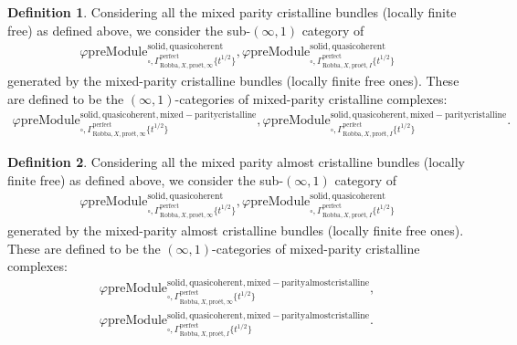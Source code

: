 \documentclass[12pt]{book}
\theoremstyle{definition}
\newtheorem{definition}{Definition}
\begin{document}
\begin{definition}
Considering all the mixed parity cristalline bundles (locally finite free) as defined above, we consider the sub-$(\infty,1)$ category of 
\begin{align}
\varphi\mathrm{preModule}^\mathrm{solid,quasicoherent}_{\square,\Gamma^\mathrm{perfect}_{\text{Robba},X,\text{pro\'et},\infty}\{t^{1/2}\}},
\varphi\mathrm{preModule}^\mathrm{solid,quasicoherent}_{\square,\Gamma^\mathrm{perfect}_{\text{Robba},X,\text{pro\'et},I}\{t^{1/2}\}} 
\end{align}
generated by the mixed-parity cristalline bundles (locally finite free ones). These are defined to be the $(\infty,1)$-categories of mixed-parity cristalline complexes:
\begin{align}
\varphi\mathrm{preModule}^\mathrm{solid,quasicoherent,mixed-paritycristalline}_{\square,\Gamma^\mathrm{perfect}_{\text{Robba},X,\text{pro\'et},\infty}\{t^{1/2}\}},
\varphi\mathrm{preModule}^\mathrm{solid,quasicoherent,mixed-paritycristalline}_{\square,\Gamma^\mathrm{perfect}_{\text{Robba},X,\text{pro\'et},I}\{t^{1/2}\}}. 
\end{align}
\end{definition}


\begin{definition}
Considering all the mixed parity almost cristalline bundles (locally finite free) as defined above, we consider the sub-$(\infty,1)$ category of 
\begin{align}
\varphi\mathrm{preModule}^\mathrm{solid,quasicoherent}_{\square,\Gamma^\mathrm{perfect}_{\text{Robba},X,\text{pro\'et},\infty}\{t^{1/2}\}},
\varphi\mathrm{preModule}^\mathrm{solid,quasicoherent}_{\square,\Gamma^\mathrm{perfect}_{\text{Robba},X,\text{pro\'et},I}\{t^{1/2}\}} 
\end{align}
generated by the mixed-parity almost cristalline bundles (locally finite free ones). These are defined to be the $(\infty,1)$-categories of mixed-parity cristalline complexes:
\begin{align}
\varphi\mathrm{preModule}^\mathrm{solid,quasicoherent,mixed-parityalmostcristalline}_{\square,\Gamma^\mathrm{perfect}_{\text{Robba},X,\text{pro\'et},\infty}\{t^{1/2}\}},\\
\varphi\mathrm{preModule}^\mathrm{solid,quasicoherent,mixed-parityalmostcristalline}_{\square,\Gamma^\mathrm{perfect}_{\text{Robba},X,\text{pro\'et},I}\{t^{1/2}\}}. 
\end{align}
\end{definition}
\end{document}
